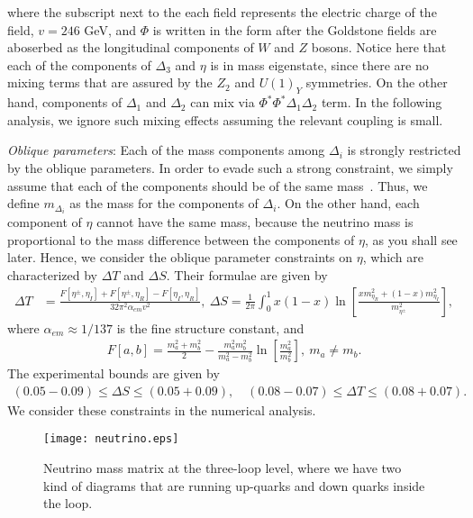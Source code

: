 \documentclass[%
showkeys,12pt,
preprint,preprintnumbers,nofootinbib,
groupedaddress,superscriptaddress,amsmath,amssymb]{revtex4}
\numberwithin{equation}{section}
\begin{document}
where the subscript next to the each field represents the electric charge
of the field, $v= 246$ GeV, 
and $\Phi$ is written {in the form after the Goldstone fields are}
aboserbed as the longitudinal components of $W$ and $Z$ bosons.
{Notice here that each of the components of $\Delta_3$ and $\eta$ is in mass eigenstate, since there are no mixing terms 
that are assured by the $Z_2$ and $U(1)_Y$ symmetries. 
On the other hand, components of $\Delta_1$ and $\Delta_{2}$ can mix via $\Phi^* \Phi^* \Delta_1 \Delta_2$ term. 
In the following analysis, we ignore such mixing effects 
assuming the relevant coupling is small. }

{\it  Oblique parameters}: Each of the mass components among $\Delta_i$ 
is strongly restricted by the oblique parameters. 
In order to evade such a strong constraint, we simply assume that 
each of the components should be of the same mass~\cite{Cheung:2016frv}.
Thus, we define $m_{\Delta_i}$ as the mass for the components of $\Delta_i$. 
On the other hand, each component of $\eta$ cannot have the same mass, 
because the neutrino mass is proportional to the mass difference 
between the components of $\eta$, as you shall see later. 
Hence, we consider the oblique parameter constraints on $\eta$, 
which are characterized by $\Delta T$ and $\Delta S$. 
Their formulae are given by~\cite{Barbieri:2006dq}
\begin{align}
\Delta T&=\frac{F[\eta^\pm,\eta_I]+F[\eta^\pm,\eta_R]-F[\eta_I,\eta_R]}{32\pi^2 \alpha_{em} v^2}, \
\Delta S=\frac{1}{2\pi} \int_0^1x(1-x) \ln\left[\frac{x m_{\eta_R}^2 + (1-x) m_{\eta_I}^2}{m_{\eta^\pm}^2}\right],
\end{align}
where $\alpha_{em}\approx 1/137$ is the fine structure constant, and
\begin{align}
F[a,b]= \frac{m_a^2+m_b^2}{2}-\frac{m_a^2m_b^2}{m_a^2-m_b^2}\ln\left[\frac{m_a^2}{m_b^2}\right], \ m_a\neq m_b.
\end{align}
The experimental bounds are given by \cite{pdg}
\begin{align}
(0.05 - 0.09) \le \Delta S \le (0.05 + 0.09), \quad (0.08 - 0.07) \le \Delta T \le (0.08 + 0.07).
 \end{align}
We consider these constraints in the numerical analysis.
 


\begin{figure}[tb]
\begin{center}
\texttt{[image: neutrino.eps]}
\caption{
Neutrino mass matrix at the three-loop level, where we have two kind of diagrams that are running up-quarks and down quarks inside the loop. 
}
\label{fig:neut}
\end{center}
\end{figure}
\end{document}
